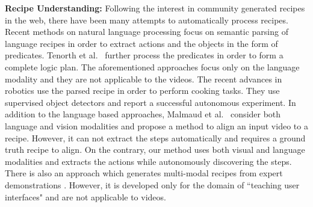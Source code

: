 \noindent\textbf{Recipe Understanding:}
Following the interest in community generated recipes in the web, there have been many attempts to automatically process recipes. Recent methods on natural language processing \cite{cookingSemantics,logicRecipe} focus on semantic parsing of language recipes in order to extract actions and the objects in the form of predicates. Tenorth et al.~\cite{logicRecipe} further process the predicates in order to form a complete logic plan. The aforementioned approaches focus only on the language modality and they are not applicable to the videos. The recent advances \cite{beetz,cookie} in robotics use the parsed recipe in order to perform cooking tasks. They use supervised object detectors and report a successful autonomous experiment. In addition to the language based approaches, Malmaud et al.~\cite{alignment} consider both language and vision modalities and propose a method to align an input video to a recipe. However, it can not extract the steps automatically and requires a ground truth recipe to align. On the contrary, our method uses both visual and language modalities and extracts the actions while autonomously discovering the steps. There is also an approach which generates multi-modal recipes from expert demonstrations \cite{photoshop}. However, it is developed only for the domain of ``teaching user interfaces" and are not applicable to videos.
